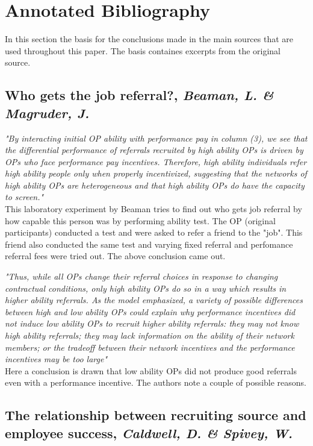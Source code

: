 \documentclass[a4paper, 11pt]{article} %
\begin{document}
\section*{Annotated Bibliography}
In this section the basis for the conclusions made in the main sources that are used throughout this paper. The basis containes excerpts from the original source.

\subsection*{Who gets the job referral?, \emph{Beaman, L. \& Magruder, J.} \cite{first}}

\emph{"By interacting initial OP ability with performance pay in column (3), we see that the differential
performance of referrals recruited by high ability OPs is driven by OPs who face performance
pay incentives. Therefore, high ability individuals refer high ability people only when properly
incentivized, suggesting that the networks of high ability OPs are heterogeneous and that high
ability OPs do have the capacity to screen."}\\

This laboratory experiment by Beaman tries to find out who gets job referral by how capable this person was by performing ability test. The OP (original participants) conducted a test and were asked to refer a friend to the "job". This friend also conducted the same test and varying fixed referral and perfomance referral fees were tried out. The above conclusion came out.

\emph{"Thus, while all OPs change their referral choices in response to changing contractual conditions,
only high ability OPs do so in a way which results in higher ability referrals. As the model
emphasized, a variety of possible differences between high and low ability OPs could explain why
performance incentives did not induce low ability OPs to recruit higher ability referrals: they
may not know high ability referrals; they may lack information on the ability of their network
members; or the tradeoff between their network incentives and the performance incentives may
be too large"}\\

Here a conclusion is drawn that low ability OPs did not produce good referrals even with a performance incentive. The authors note a couple of possible reasons.

\subsection*{The relationship between recruiting source and employee success, \emph{Caldwell, D. \& Spivey, W.} \cite{second}}
\end{document}
